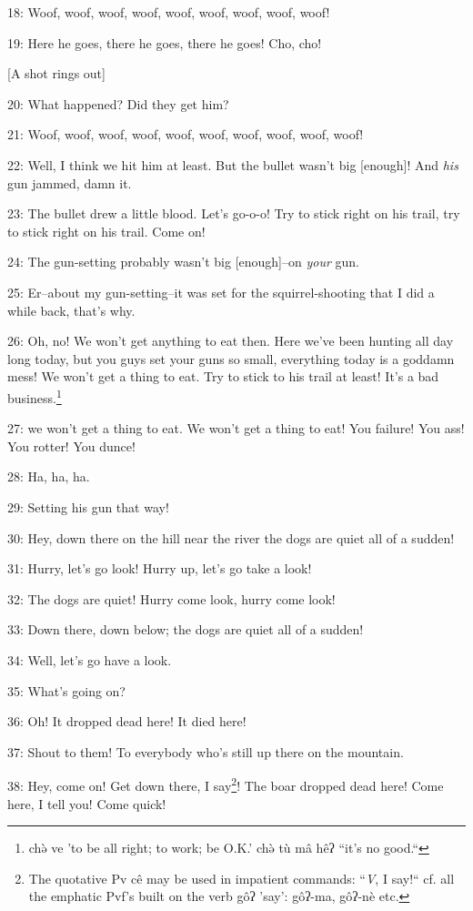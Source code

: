 18: Woof, woof, woof, woof, woof, woof, woof, woof, woof!

19: Here he goes, there he goes, there he goes! Cho, cho!

[A shot rings out]

20: What happened? Did they get him?

21:  Woof, woof, woof, woof, woof, woof, woof, woof, woof, woof!

22: Well, I think we hit him at least. But the bullet wasn't big [enough]! And
\textit{his} gun jammed, damn it.

23: The bullet drew a little blood. Let's go-o-o! Try to stick right on his trail,
try to stick right on his trail. Come on!

24: The gun-setting probably wasn't big [enough]--on \textit{your} gun.

25: Er--about my gun-setting--it was set for the squirrel-shooting that I did a
while back, that's why.

26: Oh, no! We won't get anything to eat then. Here we've been hunting all day
long today, but you guys set your guns so small, everything today is a goddamn
mess! We won't get a thing to eat. Try to stick to his trail at least! It's a bad
business.\footnote{chə̀ ve 'to be all right; to work; be O.K.' chə̀ tù mâ hêʔ ``it's no good.``}

27: we won't get a thing to eat. We won't get a thing to eat! You failure! You
ass! You rotter! You dunce!

28: Ha, ha, ha.

29: Setting his gun that way!

30: Hey, down there on the hill near the river the dogs are quiet all of a sudden!

31: Hurry, let's go look! Hurry up, let's go take a look!

32: The dogs are quiet! Hurry come look, hurry come look!

33: Down there, down below; the dogs are quiet all of a sudden!

34: Well, let's go have a look.

35: What's going on?

36: Oh! It dropped dead here! It died here!

37: Shout to them! To everybody who's still up there on the mountain.

38: Hey, come on! Get down there, I say\footnote{The quotative Pv cê may be used in impatient commands: ``\emph{V}, I say!`` cf. all the emphatic Pvf's built on the verb gôʔ 'say': gôʔ-ma, gôʔ-nè etc.}! The boar dropped dead here! Come here,
I tell you! Come quick!

